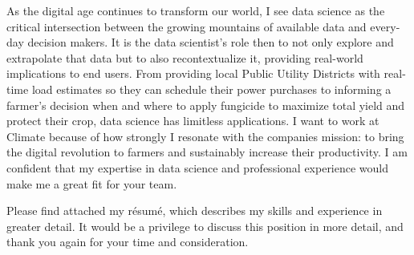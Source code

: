 \documentclass[14pt, a4paper]{awesome-cv}
\begin{document}
\begin{cvletter}
As the digital age continues to transform our world, I see data science as the critical intersection between the growing mountains of available data and every-day decision makers. It is the data scientist's role then to not only explore and extrapolate that data but to also recontextualize it, providing real-world implications to end users. From providing local Public Utility Districts with real-time load estimates so they can schedule their power purchases to informing a farmer's decision when and where to apply fungicide to maximize total yield and protect their crop, data science has limitless applications. I want to work at Climate because of how strongly I resonate with the companies mission: to bring the digital revolution to farmers and sustainably increase their productivity. I am confident that my expertise in data science and professional experience would make me a great fit for your team.

Please find attached my résumé, which describes my skills and experience in greater detail. It would be a privilege to discuss this position in more detail, and thank you again for your time and consideration.

\end{cvletter}

\makeletterclosing
\end{document}
